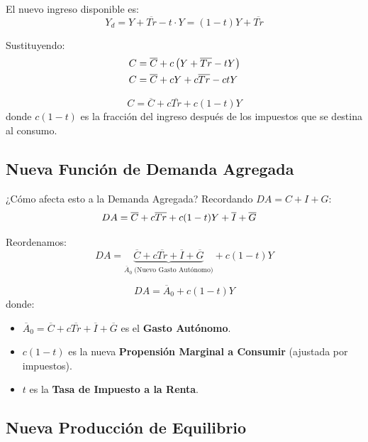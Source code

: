 \documentclass[11pt,a4paper]{article}
\newcommand{\barvar}[1]{\overline{#1}}
\begin{document}
El nuevo ingreso disponible es:
\[
Y_d = Y + \barvar{Tr} - t \cdot Y = (1-t)Y + \barvar{Tr}
\]

Sustituyendo:
\begin{align}
C &= \barvar{C} + c\left(Y + \barvar{Tr} - tY\right) \notag \\
C &= \barvar{C} + cY + c\barvar{Tr} - ctY \notag
\end{align}

\begin{resultadobox}
\begin{equation}
C = \barvar{C} + c\barvar{Tr} + c(1-t)Y \tag{4}
\end{equation}
donde $c(1-t)$ es la fracción del ingreso después de los impuestos que se destina al consumo.
\end{resultadobox}

\subsection{Nueva Función de Demanda Agregada}

¿Cómo afecta esto a la Demanda Agregada? Recordando $DA = C + I + G$:
\begin{align}
DA &= \barvar{C} + c\barvar{Tr} + c(1-t)Y + \barvar{I} + \barvar{G} \notag
\end{align}

Reordenamos:
\[
DA = \underbrace{\barvar{C} + c\barvar{Tr} + \barvar{I} + \barvar{G}}_{\barvar{A}_0 \;\text{(Nuevo Gasto Autónomo)}} + c(1-t)Y
\]

\begin{resultadobox}
\begin{equation}
DA = \barvar{A}_0 + c(1-t)Y \tag{5}
\end{equation}
donde:
\begin{itemize}
    \item $\barvar{A}_0 = \barvar{C} + c\barvar{Tr} + \barvar{I} + \barvar{G}$ es el \textbf{Gasto Autónomo}.
    \item $c(1-t)$ es la nueva \textbf{Propensión Marginal a Consumir} (ajustada por impuestos).
    \item $t$ es la \textbf{Tasa de Impuesto a la Renta}.
\end{itemize}
\end{resultadobox}

\subsection{Nueva Producción de Equilibrio}
\end{document}
